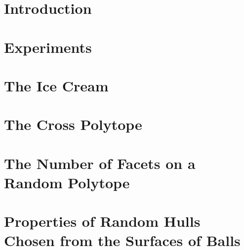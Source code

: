 \documentclass{report}
\begin{document}
%

\newpage

\tableofcontents

\chapter{Introduction}



\chapter{Experiments}



\appendix
\chapter{The Ice Cream} \label{app_ice_cream}



\chapter{The Cross Polytope} \label{app_cross_polytope}



\chapter{The Number of Facets on a Random Polytope} \label{app_cyclic_polytope}



\chapter{Properties of Random Hulls Chosen from the Surfaces of Balls} \label{app_balls}





\end{document}
